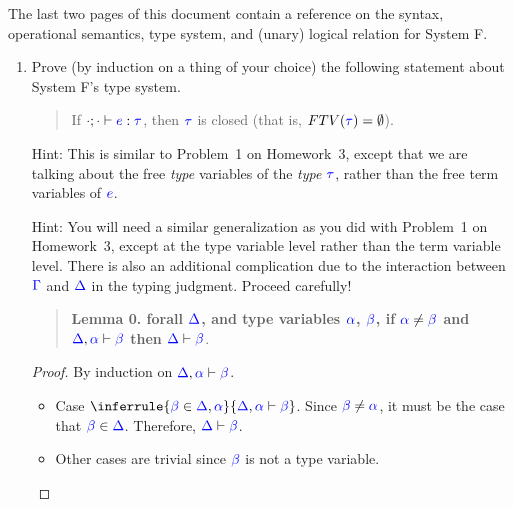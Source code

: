\documentclass{article}
\theoremstyle{definition}
\newcommand{\meta}[1]{{\color{blue}#1}}
\begin{document}
\noindent{}The last two pages of this document contain a reference on the syntax, operational semantics, type system, and (unary) logical relation for System F.
\begin{enumerate}[start=1,label={{\bf Problem \arabic*}.},ref=\arabic*,left=0pt..0pt,widest*=10,align=left,itemindent=*]
\item Prove (by induction on a thing of your choice) the following statement about System F's type system.
  \begin{quote}
    If $\cdot;\cdot\vdash\meta{e}:\meta{\tau}$, then $\meta{\tau}$ is closed (that is, $FTV(\meta{\tau}) = \emptyset$).
  \end{quote}

  Hint: This is similar to Problem~1 on Homework~3, except that we are talking about the free \emph{type} variables of the \emph{type} $\meta{\tau}$,
  rather than the free term variables of $\meta{e}$.

  Hint: You will need a similar generalization as you did with Problem~1 on
  Homework~3, except at the type variable level rather than the term variable
  level. There is also an additional complication due to the interaction between
  $\meta{\Gamma}$ and $\meta{\Delta}$ in the typing judgment. Proceed carefully!

  \begin{quote}
    \textbf{Lemma 0. forall $\meta{\Delta}$, and type variables $\meta{\alpha}$, $\meta{\beta}$, if $\meta{\alpha} \neq \meta{\beta}$ and $\meta{\Delta}, \meta{\alpha}\vdash\meta{\beta}$ then $\meta{\Delta}\vdash\meta{\beta}$}.
  \end{quote}
  \begin{proof}
    By induction on $\meta{\Delta},\meta{\alpha}\vdash\meta{\beta}$.
    \begin{itemize}
      \item Case $\inferrule{
        \meta{\beta} \in \meta{\Delta}, \meta{\alpha}
      }{\meta{\Delta},\meta{\alpha}\vdash\meta{\beta}}$. Since $\meta{\beta}\neq\meta{\alpha}$, it must be the case that $\meta{\beta}\in \meta{\Delta}$. Therefore, $\meta{\Delta}\vdash\meta{\beta}$.
      \item Other cases are trivial since $\meta{\beta}$ is not a type variable.
    \end{itemize}
  \end{proof}


\end{enumerate}
\end{document}
